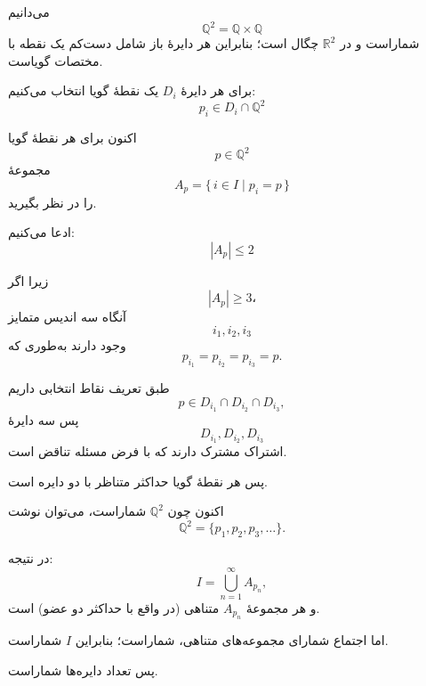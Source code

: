 می‌دانیم
\[
\mathbb{Q}^2=\mathbb{Q}\times\mathbb{Q}
\]
شماراست و در $\mathbb{R}^2$ چگال است؛ بنابراین هر دایرهٔ باز شامل دست‌کم یک نقطه با مختصات گویاست.

برای هر دایرهٔ $D_i$ یک نقطهٔ گویا انتخاب می‌کنیم:
\[
p_i\in D_i\cap \mathbb{Q}^2
\]

اکنون برای هر نقطهٔ گویا
\[
p\in\mathbb{Q}^2
\]
مجموعهٔ
\[
A_p=\{\,i\in I \mid p_i=p\,\}
\]
را در نظر بگیرید.

ادعا می‌کنیم:
\[
|A_p|\le 2
\]

زیرا اگر
\[
|A_p|\ge 3،
\]
آنگاه سه اندیس متمایز
\[
i_1,i_2,i_3
\]
وجود دارند به‌طوری که
\[
p_{i_1}=p_{i_2}=p_{i_3}=p.
\]

طبق تعریف نقاط انتخابی داریم
\[
p\in D_{i_1}\cap D_{i_2}\cap D_{i_3},
\]
پس سه دایرهٔ
\[
D_{i_1},D_{i_2},D_{i_3}
\]
اشتراک مشترک دارند که با فرض مسئله تناقض است.

پس هر نقطهٔ گویا حداکثر متناظر با دو دایره است.

اکنون چون $\mathbb{Q}^2$ شماراست، می‌توان نوشت
\[
\mathbb{Q}^2=\{p_1,p_2,p_3,\dots\}.
\]

در نتیجه:
\[
I=\bigcup_{n=1}^{\infty} A_{p_n},
\]
و هر مجموعهٔ $A_{p_n}$ متناهی (در واقع با حداکثر دو عضو) است.

اما اجتماع شمارای مجموعه‌های متناهی، شماراست؛ بنابراین $I$ شماراست.

پس تعداد دایره‌ها شماراست.

